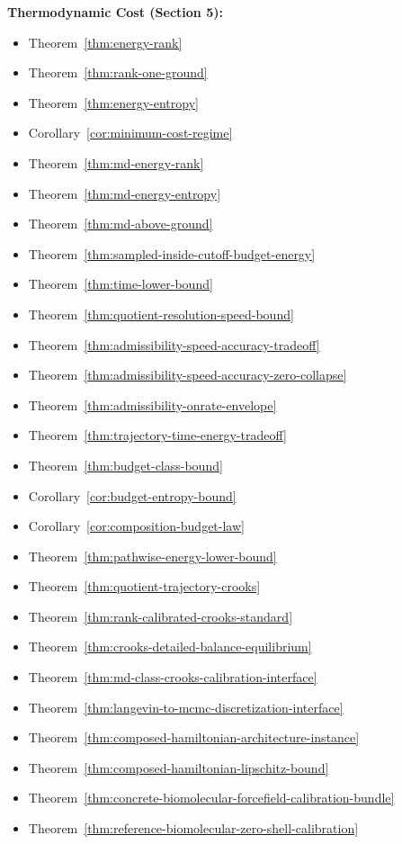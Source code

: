 \textbf{Thermodynamic Cost (Section 5):}
\begin{itemize}
\item Theorem~\ref{thm:energy-rank}
\item Theorem~\ref{thm:rank-one-ground}
\item Theorem~\ref{thm:energy-entropy}
\item Corollary~\ref{cor:minimum-cost-regime}
\item Theorem~\ref{thm:md-energy-rank}
\item Theorem~\ref{thm:md-energy-entropy}
\item Theorem~\ref{thm:md-above-ground}
\item Theorem~\ref{thm:sampled-inside-cutoff-budget-energy}
\item Theorem~\ref{thm:time-lower-bound}
\item Theorem~\ref{thm:quotient-resolution-speed-bound}
\item Theorem~\ref{thm:admissibility-speed-accuracy-tradeoff}
\item Theorem~\ref{thm:admissibility-speed-accuracy-zero-collapse}
\item Theorem~\ref{thm:admissibility-onrate-envelope}
\item Theorem~\ref{thm:trajectory-time-energy-tradeoff}
\item Theorem~\ref{thm:budget-class-bound}
\item Corollary~\ref{cor:budget-entropy-bound}
\item Corollary~\ref{cor:composition-budget-law}
\item Theorem~\ref{thm:pathwise-energy-lower-bound}
\item Theorem~\ref{thm:quotient-trajectory-crooks}
\item Theorem~\ref{thm:rank-calibrated-crooks-standard}
\item Theorem~\ref{thm:crooks-detailed-balance-equilibrium}
\item Theorem~\ref{thm:md-class-crooks-calibration-interface}
\item Theorem~\ref{thm:langevin-to-mcmc-discretization-interface}
\item Theorem~\ref{thm:composed-hamiltonian-architecture-instance}
\item Theorem~\ref{thm:composed-hamiltonian-lipschitz-bound}
\item Theorem~\ref{thm:concrete-biomolecular-forcefield-calibration-bundle}
\item Theorem~\ref{thm:reference-biomolecular-zero-shell-calibration}

\end{itemize}
